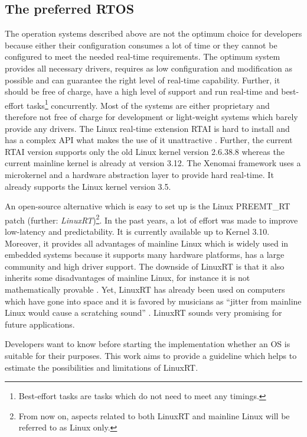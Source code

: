 \subsection{The preferred RTOS}
The operation systems described above are not the optimum choice for developers because either their configuration consumes a lot of time or they cannot be configured to meet the needed real-time requirements.
The optimum system provides all necessary drivers, requires as low configuration and modification as possible and can guarantee the right level of real-time capability. 
Further, it should be free of charge, have a high level of support and run real-time and best-effort tasks\footnote{Best-effort tasks are tasks which do not need to meet any timings.} concurrently.
Most of the systems are either proprietary and therefore not free of charge for development or light-weight systems which barely provide any drivers.
The Linux real-time extension \ac{RTAI} is hard to install and has a complex \ac{API} what makes the use of it unattractive \cite{mitschang:heulfrvr}.
Further, the current \ac{RTAI} version supports only the old Linux kernel version 2.6.38.8 \cite{rtai} whereas the current mainline kernel is already at version 3.12. 
The Xenomai framework uses a microkernel and a hardware abstraction layer to provide hard real-time. 
It already supports the Linux kernel version 3.5.
\par
An open-source alternative which is easy to set up is the Linux PREEMT\_RT patch (further: \textit{LinuxRT})\footnote{From now on, aspects related to both LinuxRT and mainline Linux will be referred to as Linux only.}.
In the past years, a lot of effort was made to improve low-latency and predictability.
It is currently available up to Kernel 3.10.
Moreover, it provides all advantages of mainline Linux which is widely used in embedded systems because it supports many hardware platforms, has a large community and high driver support.
The downside of LinuxRT is that it also inherits some disadvantages of mainline Linux, for instance it is not mathematically provable \cite{clark:itrtlfed}.
Yet, LinuxRT has already been used on computers which have gone into space and it is favored by musicians as ``jitter from mainline Linux would cause a scratching sound'' \cite{clark:itrtlfed}.
LinuxRT sounds very promising for future applications.
\par
Developers want to know before starting the implementation whether an \ac{OS} is suitable for their purposes.
This work aims to provide a guideline which helps to estimate the possibilities and limitations of LinuxRT. 
